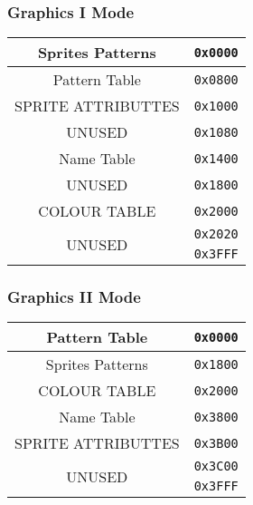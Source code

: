         \subsubsection{Graphics I Mode}
        \begin{center}
            \begin{tabular}{c r}
                \hline
                Sprites Patterns         & \texttt{0x0000}\\
                \hline
                Pattern Table           & \texttt{0x0800}\\
                \hline
                SPRITE ATTRIBUTTES      & \texttt{0x1000}\\
                \hline
                UNUSED                  & \texttt{0x1080}\\
                \hline
                Name Table              & \texttt{0x1400}\\
                \hline
                UNUSED                  & \texttt{0x1800}\\
                \hline
                COLOUR TABLE            & \texttt{0x2000}\\
                \hline
                \multirow{2}{*}{UNUSED} & \texttt{0x2020}\\
                                        & \texttt{0x3FFF}\\
                \hline
            \end{tabular}
        \end{center}

        \subsubsection{Graphics II Mode}
        \begin{center}
            \begin{tabular}{c r}
                \hline
                Pattern Table           & \texttt{0x0000}\\
                \hline
                Sprites Patterns         & \texttt{0x1800}\\
                \hline
                COLOUR TABLE            & \texttt{0x2000}\\
                \hline
                Name Table              & \texttt{0x3800}\\
                \hline
                SPRITE ATTRIBUTTES      & \texttt{0x3B00}\\
                \hline
                \multirow{2}{*}{UNUSED} & \texttt{0x3C00}\\
                                        & \texttt{0x3FFF}\\
                \hline
            \end{tabular}
        \end{center}

